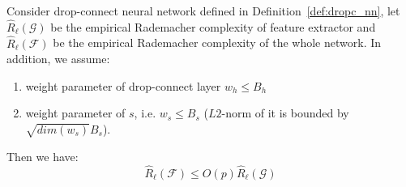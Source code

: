 \documentclass[9pt]{article}
\begin{document}
\begin{theorem}
   \label{thm:drop_model_bound}
   Consider drop-connect neural network defined in Definition~\ref{def:dropc_nn},
   let $\hat{R}_{\ell}(\mathcal{G})$ be the empirical Rademacher complexity of feature extractor
   and $\hat{R}_{\ell}(\mathcal{F})$ be the empirical Rademacher complexity of the whole network. 
   In addition, we assume:
   \begin{enumerate}
       \item weight parameter of drop-connect layer $w_h \leq B_h$ 
       \item weight parameter of $s$, i.e. $w_s \leq B_s$ ($L2$-norm of it is bounded by $\sqrt{dim(w_s)}B_s$).
   \end{enumerate}
   Then we have: 
   $$
   \hat{R}_{\ell}(\mathcal{F}) \leq O(p)\hat{R}_{\ell}(\mathcal{G})
   $$
\end{theorem}
\end{document}
